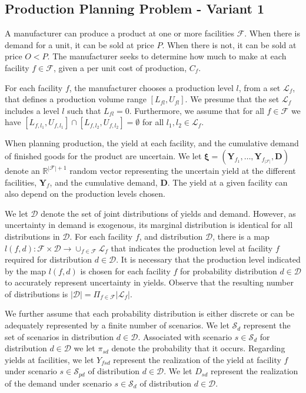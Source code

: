 \documentclass[12pt]{article}
\theoremstyle{thmstylethree}%
\newcommand{\mtc}[1] {\mathcal{#1}}
\newcommand{\rv}[1]{\ensuremath{\bm{#1}}}
\def\R{\ensuremath{\mathbb{R}}}
\begin{document}
\subsection{Production Planning Problem - Variant 1}
\label{sec:model}
 A manufacturer can produce a product at one or more facilities $\mathcal{F}$. 
 When there is demand for a unit, it can be sold at price $P.$ When there is not, it can be sold at price $O < P$.
 The manufacturer seeks to determine how much to make at each facility $f \in \mathcal{F}$, given a per unit cost of production, $C_{f}.$
 
 For each facility $f$, the manufacturer chooses a production level $l$, from a set $\mathcal{L}_{f}$, that defines a production volume range $[L_{fl},U_{fl}]$. 
 We presume that the set $\mathcal{L}_{f}$ includes a level $l$ such that $L_{fl}=0$. Furthermore, we assume that for all $f\in\mtc{F}$ we have $[L_{f,l_1},U_{f,l_1}]\cap [L_{f,l_2},U_{f,l_2}]=\emptyset$ for all $l_1,l_2\in\mtc{L}_f$.
 

When planning production, the yield at each facility, and the cumulative demand of finished goods for the product are uncertain. 
We let $\rv{\xi}=(\mathbf{Y}_{f_1},\ldots,\mathbf{Y}_{f_{|\mathcal{F}|}},\mathbf{D})$ denote an $\R^{|\mtc{F}|+1}$ random vector representing the uncertain yield at the different facilities, $\mathbf{Y}_{f}$, and the cumulative demand, $\mathbf{D}$. 
The yield at a given facility can also depend on the production levels chosen. 


We let $\mtc{D}$ denote the set of joint distributions of yields and demand. However, as uncertainty in demand is exogenous, its marginal distribution  is identical for all distributions in $\mtc{D}.$ %
For each facility $f$, and distribution $\mtc{D}$, there is a map $l(f,d):\mtc{F}\times \mtc{D}\to \cup_{f\in\mtc{F}}\mtc{L}_f$ that indicates the production level at facility $f$ required for distribution $d \in \mtc{D}$. 
It is necessary that the production level indicated by the map $l(f,d)$ is chosen for each facility $f$ for probability distribution $d\in\mtc{D}$ to accurately represent uncertainty in yields. Observe that the resulting number of distributions is $\vert \mathcal{D} \vert =  \Pi_{f\in\mtc{F}}\vert  \mathcal{L}_f \vert$.


We further assume that each probability distribution is either discrete or can be adequately represented by a finite number of scenarios. 
We let $\mtc{S}_{d}$ represent the set of scenarios in distribution $d \in \mtc{D}$. 
Associated with scenario $s \in \mtc{S}_{d}$ for distribution $d \in \mtc{D}$ we let $\pi_{sd}$ denote the probability that it occurs. Regarding yields at facilities, we let $Y_{fsd}$ represent the realization of the yield at facility $f$ under scenario $s\in\mtc{S}_{pd}$ of distribution $d\in\mtc{D}$. We let $D_{sd}$ represent the realization of the demand  under scenario $s\in\mtc{S}_{d}$ of distribution $d\in\mtc{D}$.
\end{document}
